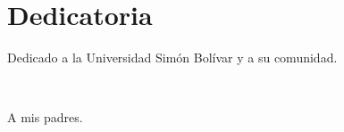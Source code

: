 \chapter*{Dedicatoria}

\par Dedicado a la Universidad Simón Bolívar y a su comunidad.
\par ~
\par A mis padres.
